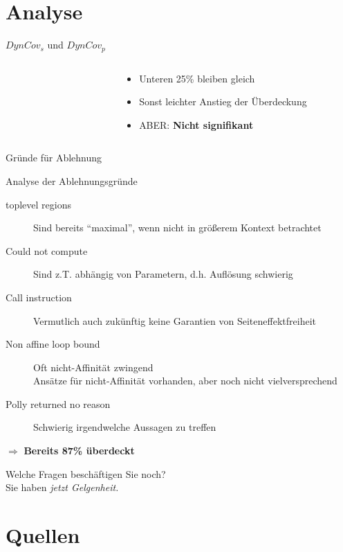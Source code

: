 \documentclass[aspectratio=169, xcolor=dvipsnames]{beamer}
\begin{document}
\section{Analyse}
\begin{frame}{\(DynCov_s\) und \(DynCov_p\)}
    \vspace{-1cm}
    \begin{columns}
        \begin{column}{5cm}
            \begin{figure}[!h]
                
            \end{figure}
        \end{column}
        \begin{column}{5cm}
            \begin{itemize}
                \item Unteren 25\% bleiben gleich
                \item Sonst leichter Anstieg der Überdeckung
                \item ABER: \textbf{Nicht signifikant}
            \end{itemize}
        \end{column}
    \end{columns}
\end{frame}
\begin{frame}{Gründe für Ablehnung}
    \vspace{-0.2cm}
    \begin{figure}[!h]
        
     \end{figure}
\end{frame}
\begin{frame}{Analyse der Ablehnungsgründe}
    \begin{description}
        \item[toplevel regions]Sind bereits \enquote{maximal}, wenn nicht in größerem Kontext betrachtet
        \item[Could not compute]Sind z.T. abhängig von Parametern, d.h. Auflösung schwierig
        \item[Call instruction]Vermutlich auch zukünftig keine Garantien von Seiteneffektfreiheit
        \item[Non affine loop bound]Oft nicht-Affinität zwingend\\
            Ansätze für nicht-Affinität vorhanden, aber noch nicht vielversprechend
        \item[Polly returned no reason]Schwierig irgendwelche Aussagen zu treffen
    \end{description}
    \(\Rightarrow\) \textbf{Bereits 87\% überdeckt}
\end{frame}

\begin{frame}[plain]
    \begin{center}
        \Huge{Welche Fragen beschäftigen Sie noch?}\\
        \Large{Sie haben \em{jetzt} Gelgenheit.}
    \end{center}
\end{frame}

\section{Quellen}
\begin{frame}[allowframebreaks]{\secname}
    \nocite{*}
    \printbibliography
\end{frame}
\end{document}
